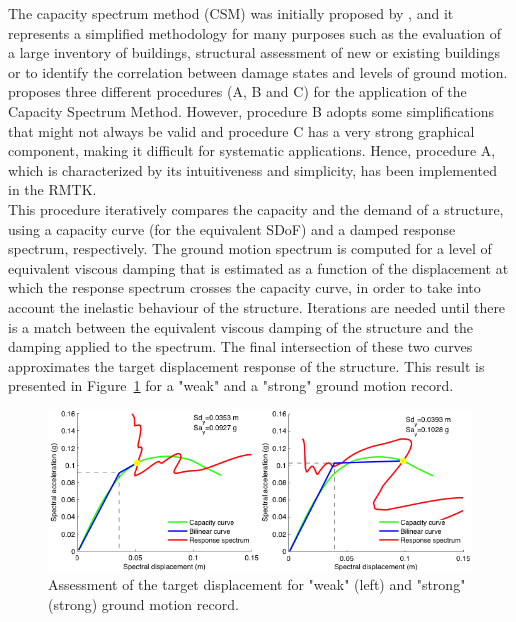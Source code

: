 The capacity spectrum method (CSM) was initially proposed by \citep{FreemanEtAl1975}, and it represents a simplified methodology for many purposes such as the evaluation of a large inventory of buildings, structural assessment of new or existing buildings or to identify the correlation between damage states and levels of ground motion. \citet{ATC1996} proposes three different procedures (A, B and C) for the application of the Capacity Spectrum Method. However, procedure B adopts some simplifications that might not always be valid and procedure C has a very strong graphical component, making it difficult for systematic applications. Hence, procedure A, which is characterized by its intuitiveness and simplicity, has been implemented in the RMTK.\\

This procedure iteratively compares the capacity and the demand of a structure, using a capacity curve (for the equivalent SDoF) and a damped response spectrum, respectively. The ground motion spectrum is computed for a level of equivalent viscous damping that is estimated as a function of the displacement at which the response spectrum crosses the capacity curve, in order to take into account the inelastic behaviour of the structure. Iterations are needed until there is a match between the equivalent viscous damping of the structure and the damping applied to the spectrum. The final intersection of these two curves approximates the target displacement response of the structure. This result is presented in Figure~\ref{fig:per_point} for a "weak" and a "strong" ground motion record. \\

\begin{figure}[htb]
  \centering
      \includegraphics[width=12cm]{Figures/performance_points.png}
  \caption{Assessment of the target displacement for "weak" (left) and "strong" (strong) ground motion record.}
  \label{fig:per_point}
\end{figure}

